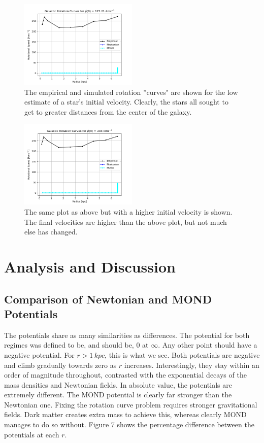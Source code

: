 \documentclass[11pt, twocolumn]{article}
\begin{document}
    \begin{figure}[h]
        \includegraphics[width=0.5\textwidth]{images/low.png}
        \caption{The empirical and simulated rotation ''curves" are shown for the low estimate of a star's initial velocity. Clearly, the stars all sought to get to greater distances from the center of the galaxy.}
        \label{fig:rotation}
    \end{figure}

    \begin{figure}[h]
        \includegraphics[width=0.5\textwidth]{images/high.png}
        \caption{The same plot as above but with a higher initial velocity is shown. The final velocities are higher than the above plot, but not much else has changed.}
        \label{fig:rotation}
    \end{figure}
    
    \section*{Analysis and Discussion}
    \subsection*{Comparison of Newtonian and MOND Potentials}
    The potentials share as many similarities as differences. The potential for both regimes was defined to be, and should be, $0$ at $\infty$. Any other point should have a negative potential. For $r > 1 \, \si{kpc}$, this is what we see. Both potentials are negative and climb gradually towards zero as $r$ increases. Interestingly, they stay within an order of magnitude throughout, contrasted with the exponential decays of the mass densities and Newtonian fields. In absolute value, the potentials are extremely different. The MOND potential is clearly far stronger than the Newtonian one. Fixing the rotation curve problem requires stronger gravitational fields. Dark matter creates extra mass to achieve this, whereas clearly MOND manages to do so without. Figure 7 shows the percentage difference between the potentials at each $r$.
    
\end{document}
